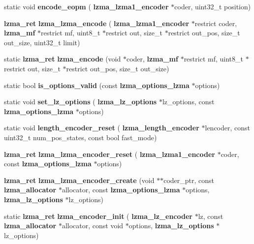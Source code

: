 \begin{DoxyCompactItemize}
static void {\bfseries encode\+\_\+eopm} (\textbf{ lzma\+\_\+lzma1\+\_\+encoder} $\ast$coder, uint32\+\_\+t position)
\item 
\mbox{\label{lzma__encoder_8c_a0b18beb1a24a7116046d2b41fb53a171}} 
\textbf{ lzma\+\_\+ret} {\bfseries lzma\+\_\+lzma\+\_\+encode} (\textbf{ lzma\+\_\+lzma1\+\_\+encoder} $\ast$restrict coder, \textbf{ lzma\+\_\+mf} $\ast$restrict mf, uint8\+\_\+t $\ast$restrict out, size\+\_\+t $\ast$restrict out\+\_\+pos, size\+\_\+t out\+\_\+size, uint32\+\_\+t limit)
\item 
\mbox{\label{lzma__encoder_8c_a5e61e552f6b38ffbfecc42e3a3d67fd0}} 
static \textbf{ lzma\+\_\+ret} {\bfseries lzma\+\_\+encode} (void $\ast$coder, \textbf{ lzma\+\_\+mf} $\ast$restrict mf, uint8\+\_\+t $\ast$restrict out, size\+\_\+t $\ast$restrict out\+\_\+pos, size\+\_\+t out\+\_\+size)
\item 
\mbox{\label{lzma__encoder_8c_a1426dd8519ffbb53ea746985452a9228}} 
static bool {\bfseries is\+\_\+options\+\_\+valid} (const \textbf{ lzma\+\_\+options\+\_\+lzma} $\ast$options)
\item 
\mbox{\label{lzma__encoder_8c_a320e15eb89bf06c7d0bc3475ad7f799f}} 
static void {\bfseries set\+\_\+lz\+\_\+options} (\textbf{ lzma\+\_\+lz\+\_\+options} $\ast$lz\+\_\+options, const \textbf{ lzma\+\_\+options\+\_\+lzma} $\ast$options)
\item 
\mbox{\label{lzma__encoder_8c_a5cf00161eefbc2d476682c93a50909b5}} 
static void {\bfseries length\+\_\+encoder\+\_\+reset} (\textbf{ lzma\+\_\+length\+\_\+encoder} $\ast$lencoder, const uint32\+\_\+t num\+\_\+pos\+\_\+states, const bool fast\+\_\+mode)
\item 
\mbox{\label{lzma__encoder_8c_a46b40295673635f6ec31fa93518607c6}} 
\textbf{ lzma\+\_\+ret} {\bfseries lzma\+\_\+lzma\+\_\+encoder\+\_\+reset} (\textbf{ lzma\+\_\+lzma1\+\_\+encoder} $\ast$coder, const \textbf{ lzma\+\_\+options\+\_\+lzma} $\ast$options)
\item 
\mbox{\label{lzma__encoder_8c_adae8d35bb6472b2e8c188fa0689048d9}} 
\textbf{ lzma\+\_\+ret} {\bfseries lzma\+\_\+lzma\+\_\+encoder\+\_\+create} (void $\ast$$\ast$coder\+\_\+ptr, const \textbf{ lzma\+\_\+allocator} $\ast$allocator, const \textbf{ lzma\+\_\+options\+\_\+lzma} $\ast$options, \textbf{ lzma\+\_\+lz\+\_\+options} $\ast$lz\+\_\+options)
\item 
\mbox{\label{lzma__encoder_8c_ad00e82cc46428457f1c08bf70fe5e6c6}} 
static \textbf{ lzma\+\_\+ret} {\bfseries lzma\+\_\+encoder\+\_\+init} (\textbf{ lzma\+\_\+lz\+\_\+encoder} $\ast$lz, const \textbf{ lzma\+\_\+allocator} $\ast$allocator, const void $\ast$options, \textbf{ lzma\+\_\+lz\+\_\+options} $\ast$lz\+\_\+options)
$$
\end{DoxyCompactItemize}
